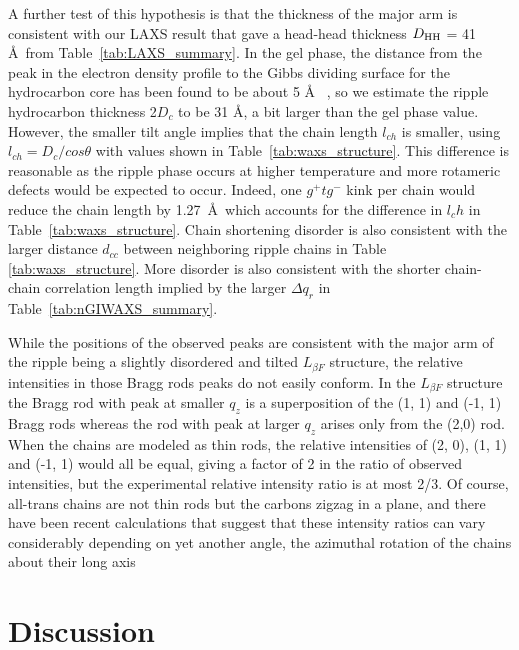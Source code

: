 A further test of this hypothesis is that the thickness of the major arm is 
consistent with our LAXS result that gave a head-head thickness 
$D_\textrm{HH}$ = 41 \AA\ from Table~\ref{tab:LAXS_summary}. In the gel phase, the 
distance from the peak in the electron density profile to the Gibbs dividing 
surface for the hydrocarbon core has been found to be about 5 \AA
~\cite{Tristram-Nagle02}, so we estimate the ripple hydrocarbon thickness 
2$D_c$ to be 31 \AA, a bit larger than the gel phase value. However, the 
smaller tilt angle implies that the chain length $l_{ch}$ is smaller, using 
$l_{ch}=D_c/cos{\theta}$ with values shown in Table~\ref{tab:waxs_structure}.  
This difference is reasonable as the ripple phase occurs at higher temperature 
and more rotameric defects would be expected to occur.  Indeed, one 
$g^+tg^-$ kink per chain would reduce the chain length by 1.27~\AA\ which 
accounts for the difference in $l_ch$ in Table~\ref{tab:waxs_structure}.  
Chain shortening disorder is also consistent with the larger distance 
$d_{cc}$ between neighboring ripple chains in Table \ref{tab:waxs_structure}.  
More disorder is also consistent with the shorter chain-chain correlation 
length implied by the larger ${\Delta}q_r$ in Table~\ref{tab:nGIWAXS_summary}.

While the positions of the observed peaks are consistent
with the major arm of the ripple being a slightly disordered and tilted 
$L_{\beta F}$ structure, 
the relative intensities in those Bragg rods peaks do not easily conform. 
In the $L_{\beta F}$ structure the Bragg rod with peak at smaller $q_z$ is a 
superposition of the (1, 1) and (-1, 1) Bragg rods whereas the rod with peak 
at larger $q_z$ arises only from the (2,0) rod.  When the chains are modeled as 
thin rods, the relative intensities 
of (2, 0), (1, 1) and (-1, 1) would all be equal, giving a factor of 2 in the 
ratio of observed intensities, but the experimental relative intensity ratio 
is at most 2/3. Of course, all-trans chains are not thin rods but the carbons 
zigzag in a plane, and there have been recent calculations that suggest that 
these intensity ratios can vary considerably depending on yet another angle, 
the azimuthal rotation of the chains about their long axis \cite{ref:Akabori14,ref:Watkins14}

\newpage
\section{Discussion}\label{sec:ripple_discussion}
